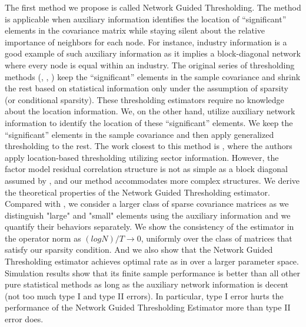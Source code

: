 The first method we propose is called Network Guided Thresholding. The method is applicable when auxiliary information identifies the location of “significant” elements in the covariance matrix while staying silent about the relative importance of neighbors for each node. For instance, industry information is a good example of such auxiliary information as it implies a block-diagonal network where every node is equal within an industry. The original series of thresholding methods (\cite{bickel2008CovarianceRegularization}, \cite{cai2011adaptive}, \cite{fan2013large}) keep the “significant” elements in the sample covariance and shrink the rest based on statistical information only under the assumption of sparsity (or conditional sparsity). These thresholding estimators require no knowledge about the location information. We, on the other hand, utilize auxiliary network information to identify the location of these “significant” elements. We keep the “significant” elements in the sample covariance and then apply generalized thresholding to the rest. The work closest to this method is \cite{fan2016incorporating}, where the authors apply location-based thresholding utilizing sector information. However, the factor model residual correlation structure is not as simple as a block diagonal assumed by \cite{fan2016incorporating}, and our method accommodates more complex structures. We derive the theoretical properties of the Network Guided Thresholding estimator. Compared with \cite{bickel2008CovarianceRegularization}, we consider a larger class of sparse covariance matrices as we distinguish "large" and "small" elements using the auxiliary information and we quantify their behaviors separately.
We show the consistency of the estimator in the operator norm as $(log N)/T\to 0$, uniformly over the class of matrices that satisfy our sparsity condition. And we also show that the Network Guided Thresholding estimator achieves optimal rate as in \cite{bickel2008CovarianceRegularization} over a larger parameter space. Simulation results show that its finite sample performance is better than all other pure statistical methods as long as the auxiliary network information is decent (not too much type I and type II errors). In particular, type I error hurts the performance of the Network Guided Thresholding Estimator more than type II error does.


